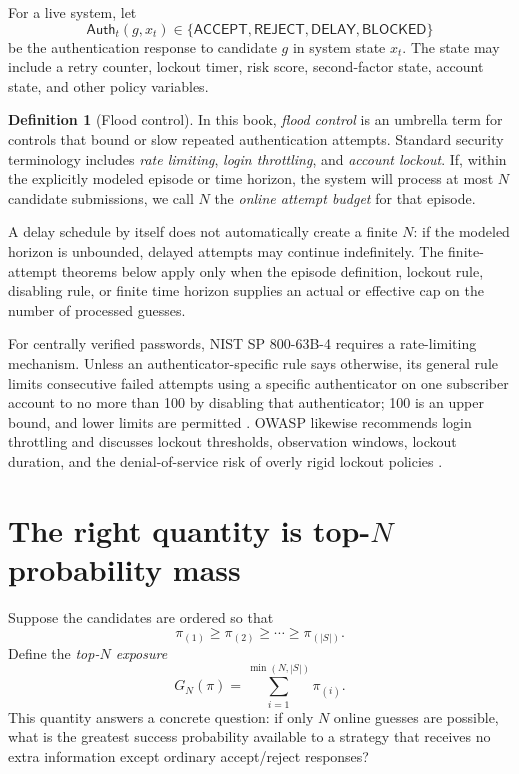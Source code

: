 \documentclass[11pt,openany]{book}
\theoremstyle{definition}
\newtheorem{definition}[theorem]{Definition}
\theoremstyle{remark}
\begin{document}
For a live system, let
\[
\mathsf{Auth}_t(g,x_t)\in\{\textsf{ACCEPT},\textsf{REJECT},\textsf{DELAY},\textsf{BLOCKED}\}
\]
be the authentication response to candidate $g$ in system state $x_t$. The state may include a retry counter, lockout timer, risk score, second-factor state, account state, and other policy variables.

\begin{definition}[Flood control]
In this book, \emph{flood control} is an umbrella term for controls that bound or slow repeated authentication attempts. Standard security terminology includes \emph{rate limiting}, \emph{login throttling}, and \emph{account lockout}. If, within the explicitly modeled episode or time horizon, the system will process at most $N$ candidate submissions, we call $N$ the \emph{online attempt budget} for that episode.
\end{definition}

A delay schedule by itself does not automatically create a finite $N$: if the modeled horizon is unbounded, delayed attempts may continue indefinitely. The finite-attempt theorems below apply only when the episode definition, lockout rule, disabling rule, or finite time horizon supplies an actual or effective cap on the number of processed guesses.

For centrally verified passwords, NIST SP 800-63B-4 requires a rate-limiting mechanism. Unless an authenticator-specific rule says otherwise, its general rule limits consecutive failed attempts using a specific authenticator on one subscriber account to no more than 100 by disabling that authenticator; 100 is an upper bound, and lower limits are permitted \cite{NIST80063B4}. OWASP likewise recommends login throttling and discusses lockout thresholds, observation windows, lockout duration, and the denial-of-service risk of overly rigid lockout policies \cite{OWASPAuth}.

\section{The right quantity is top-\texorpdfstring{$N$}{N} probability mass}
Suppose the candidates are ordered so that
\[
\pi_{(1)}\ge \pi_{(2)}\ge\cdots\ge\pi_{(|S|)}.
\]
Define the \emph{top-$N$ exposure}
\[
G_N(\pi)=\sum_{i=1}^{\min(N,|S|)}\pi_{(i)}.
\]
This quantity answers a concrete question: if only $N$ online guesses are possible, what is the greatest success probability available to a strategy that receives no extra information except ordinary accept/reject responses?
\end{document}

